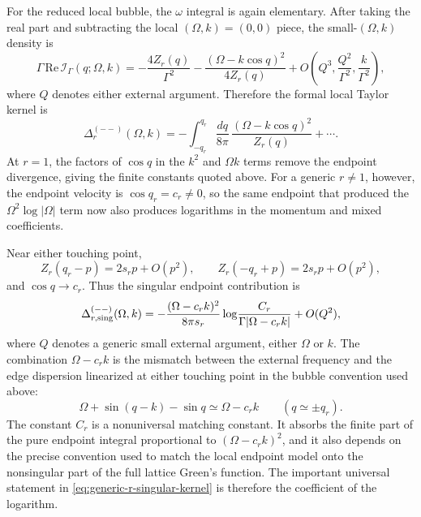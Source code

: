 \documentclass[aps,prx,preprint,amsmath,amssymb]{revtex4-2}
\renewcommand{\Re}{\text{Re}}
\begin{document}
For the reduced local bubble, the \(\omega\) integral is again elementary.  After
taking the real part and subtracting the local \((\Omega,k)=(0,0)\) piece, the
small-\((\Omega,k)\) density is
\begin{equation}
\label{eq:generic-r-density}
\Gamma\,\Re\,\mathcal I_\Gamma(q;\Omega,k)
=
-\frac{4Z_r(q)}{\Gamma^2}
-\frac{(\Omega-k\cos q)^2}{4Z_r(q)}
+O\!\left(Q^3,\frac{Q^2}{\Gamma^2},\frac{k}{\Gamma^2}\right),
\end{equation}
where \(Q\) denotes either external argument.  Therefore the formal local Taylor
kernel is
\begin{equation}
\label{eq:generic-r-formal-kernel}
\Delta_r^{(--)}(\Omega,k)
=
-\int_{-q_r}^{q_r}\frac{dq}{8\pi}\,
\frac{(\Omega-k\cos q)^2}{Z_r(q)}
+\cdots.
\end{equation}
At \(r=1\), the factors of \(\cos q\) in the \(k^2\) and \(\Omega k\) terms
remove the endpoint divergence, giving the finite constants quoted above.  For a
generic \(r\neq1\), however, the endpoint velocity is
\(\cos q_r=c_r\neq0\), so the same endpoint that produced the
\(\Omega^2\log|\Omega|\) term now also produces logarithms in the momentum and
mixed coefficients.

Near either touching point,
\begin{equation}
Z_r(q_r-p)=2s_r p+O(p^2),
\qquad
Z_r(-q_r+p)=2s_r p+O(p^2),
\end{equation}
and \(\cos q\to c_r\).  Thus the singular endpoint contribution is
\begin{equation}
\label{eq:generic-r-singular-kernel}
\Delta_{r,\rm sing}^{(--)}(\Omega,k)
=
-\frac{(\Omega-c_r k)^2}{8\pi s_r}
\log\!\frac{C_r}{\Gamma|\Omega-c_r k|}
+O(Q^2),
\end{equation}
where \(Q\) denotes a generic small external argument, either \(\Omega\) or
\(k\).  The combination
\(\Omega-c_r k\) is the mismatch between the external frequency and the edge
dispersion linearized at either touching point in the bubble convention used
above:
\[
\Omega+\sin(q-k)-\sin q \simeq \Omega-c_r k
\qquad
(q\simeq \pm q_r).
\]
The constant \(C_r\) is a nonuniversal matching constant.  It absorbs the
finite part of the pure endpoint integral proportional to
\((\Omega-c_r k)^2\), and it also depends on the precise convention used to
match the local endpoint model onto the nonsingular part of the full lattice
Green's function.  The important universal statement in
\eqref{eq:generic-r-singular-kernel} is therefore the coefficient of the
logarithm.
\end{document}
